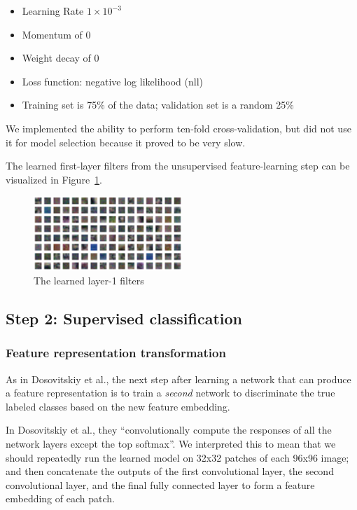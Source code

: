 \documentclass{article} %
\newenvironment{itemizedense}{
\begin{itemize}
  \setlength{\itemsep}{1pt}
  \setlength{\parskip}{0pt}
  \setlength{\parsep}{0pt}
}{\end{itemize}}
\begin{document}
\begin{itemizedense}
\item Learning Rate $1 \times 10^{-3}$
\item Momentum of $0$
\item Weight decay of $0$
\item Loss function: negative log likelihood (nll)
\item Training set is 75\% of the data; validation set is a random 25\%
\end{itemizedense}

We implemented the ability to perform ten-fold cross-validation, but did not use it for model selection because it proved to be very slow.

The learned first-layer filters from the unsupervised feature-learning step can be visualized in Figure~\ref{figfilt}.

\begin{figure}[h]
\centering
\includegraphics[width=0.5\textwidth]{figs/filter_sur.png}
\caption{The learned layer-1 filters}
\label{figfilt}
\end{figure}


\subsection{Step 2: Supervised classification}

\subsubsection{Feature representation transformation}

As in Dosovitskiy et al., the next step after learning a network that can produce a feature representation is to train a \emph{second} network to discriminate the true labeled classes based on the new feature embedding.

In Dosovitskiy et al., they ``convolutionally compute the responses of all the network layers except the top softmax''. We interpreted this to mean that we should repeatedly run the learned model on 32x32 patches of each 96x96 image; and then concatenate the outputs of the first convolutional layer, the second convolutional layer, and the final fully connected layer to form a feature embedding of each patch. 
\end{document}

